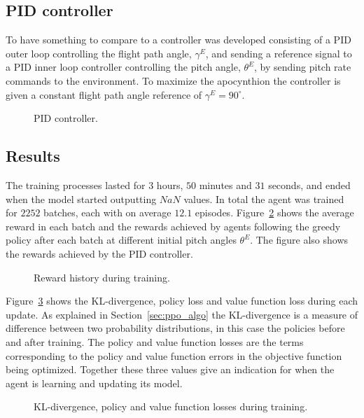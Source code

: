 \subsection{PID controller}
To have something to compare to a controller was developed consisting of a PID outer loop controlling the flight path angle, $\gamma^E$, and sending a reference signal to a PID inner loop controller controlling the pitch angle, $\theta^E$, by sending pitch rate commands to the environment. To maximize the apocynthion the controller is given a constant flight path angle reference of $\gamma^E=90^\circ$.

\begin{figure}[ht]			
	\centering
				
	\caption{PID controller.}
	\label{fig:to_pid}
\end{figure}

\subsection{Results}
The training processes lasted for $3$ hours, $50$ minutes and $31$ seconds, and ended when the model started outputting $NaN$ values. In total the agent was trained for $2252$ batches, each with on average $12.1$ episodes. Figure~\ref{fig:to_rewards} shows the average reward in each batch and the rewards achieved by agents following the greedy policy after each batch at different initial pitch angles $\theta^E$. The figure also shows the rewards achieved by the PID controller.

\begin{figure}[ht]			
	\centering
				
	\caption{Reward history during training.}
	\label{fig:to_rewards}
\end{figure}

Figure~\ref{fig:to_losses} shows the KL-divergence, policy loss and value function loss during each update. As explained in Section~\ref{sec:ppo_algo} the KL-divergence is a measure of difference between two probability distributions, in this case the policies before and after training. The policy and value function losses are the terms corresponding to the policy and value function errors in the objective function being optimized. Together these three values give an indication for when the agent is learning and updating its model.

\begin{figure}[ht]			
	\centering
				
	\caption{KL-divergence, policy and value function losses during training.}
	\label{fig:to_losses}
\end{figure}


